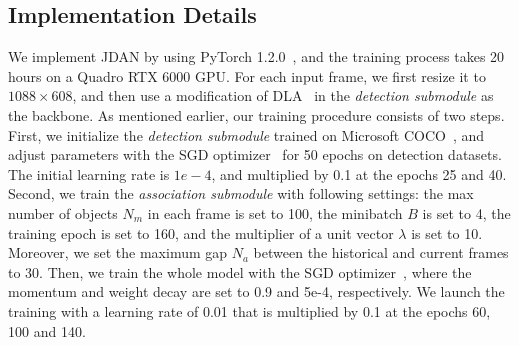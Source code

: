 \documentclass[acmsmall]{acmart}
\begin{document}
\subsection{Implementation Details} \label{sec:implementation_details}

{We} implement JDAN by using PyTorch 1.2.0~\cite{pytorch}, 
and the training process takes 20 hours on a Quadro RTX 6000 GPU. 
{
For each input frame, we first resize it to $1088\times608$, and then use}
a modification of DLA~\cite{point} in the \emph{detection submodule} as the backbone. 
{
As mentioned earlier, our training procedure consists of two steps.
}
First, we initialize the \emph{detection submodule} trained on Microsoft COCO~\cite{lin2014microsoft},
and adjust parameters with the SGD optimizer~\cite{sgd} for 50 epochs on detection datasets.
The initial learning rate is $1e-4$, and multiplied by 0.1 at the epochs 25 and 40. 
{
Second, we train the \emph{association submodule} with following settings:}
the max number of objects $N_m$ in each frame is set to 100, the minibatch $B$ is set to 4, the training epoch is set to 160, and the multiplier of a unit vector $\lambda$ is set to 10. 
Moreover, we set the maximum gap $N_a$ between the historical and current frames to 30. 
Then, we train the whole model with the SGD optimizer~\cite{sgd}, where the momentum and weight decay are set to 0.9 and 5e-4, respectively. 
We launch the training with a learning rate of 0.01 that is multiplied by 0.1 at the epochs 60, 100 and 140. 
\end{document}
